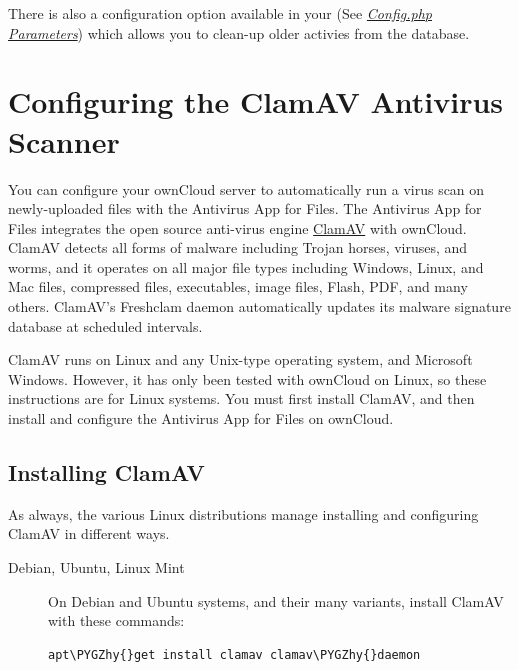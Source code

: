\documentclass[letterpaper,10pt,english]{sphinxmanual}
\def\PYGZhy{\char`\-}
\begin{document}
There is also a configuration option  available in your
 (See {\hyperref[configuration_server/config_sample_php_parameters::doc]{\emph{\emph{Config.php Parameters}}}}) which allows
you to clean-up older activies from the database.


\section{Configuring the ClamAV Antivirus Scanner}
\label{configuration_server/antivirus_configuration::doc}\label{configuration_server/antivirus_configuration:configuring-the-clamav-antivirus-scanner}
You can configure your ownCloud server to automatically run a virus scan on
newly-uploaded files with the Antivirus App for Files. The Antivirus App for
Files integrates the open source anti-virus engine \href{http://www.clamav.net/index.html}{ClamAV}  with ownCloud. ClamAV detects all forms
of malware including Trojan horses, viruses, and worms, and it operates on all
major file types including Windows, Linux, and Mac files, compressed files,
executables, image files, Flash, PDF, and many others. ClamAV's Freshclam
daemon automatically updates its malware signature database at scheduled
intervals.

ClamAV runs on Linux and any Unix-type operating system, and Microsoft Windows.
However, it has only been tested with ownCloud on Linux, so these instructions
are for Linux systems. You must first install ClamAV, and then install and
configure the Antivirus App for Files on ownCloud.


\subsection{Installing ClamAV}
\label{configuration_server/antivirus_configuration:installing-clamav}
As always, the various Linux distributions manage installing and configuring
ClamAV in different ways.
\begin{description}
\item[{Debian, Ubuntu, Linux Mint}] \leavevmode
On Debian and Ubuntu systems, and their many variants, install ClamAV with
these commands:

\begin{Verbatim}[commandchars=\\\{\}]
apt\PYGZhy{}get install clamav clamav\PYGZhy{}daemon
\end{Verbatim}

\end{description}
\end{document}
